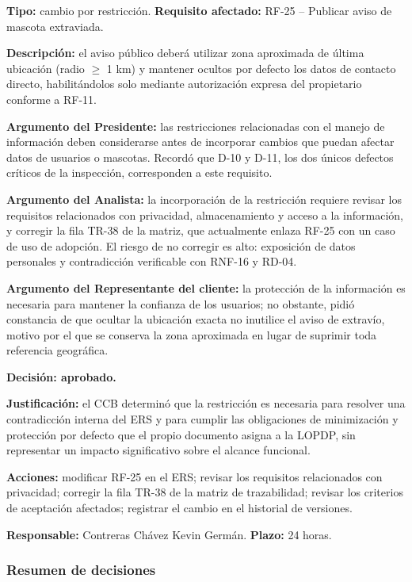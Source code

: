 \documentclass[journal,onecolumn]{IEEEtran}
\begin{document}
	\textbf{Tipo:} cambio por restricción. \quad \textbf{Requisito afectado:} RF-25 -- Publicar aviso
	de mascota extraviada.
	
	\textbf{Descripción:} el aviso público deberá utilizar zona aproximada de última ubicación
	(radio $\geq$ 1 km) y mantener ocultos por defecto los datos de contacto directo, habilitándolos
	solo mediante autorización expresa del propietario conforme a RF-11.
	
	\textbf{Argumento del Presidente:} las restricciones relacionadas con el manejo de información
	deben considerarse antes de incorporar cambios que puedan afectar datos de usuarios o mascotas.
	Recordó que D-10 y D-11, los dos únicos defectos críticos de la inspección, corresponden a este
	requisito.
	
	\textbf{Argumento del Analista:} la incorporación de la restricción requiere revisar los
	requisitos relacionados con privacidad, almacenamiento y acceso a la información, y corregir la
	fila TR-38 de la matriz, que actualmente enlaza RF-25 con un caso de uso de adopción. El riesgo de
	no corregir es alto: exposición de datos personales y contradicción verificable con RNF-16 y
	RD-04.
	
	\textbf{Argumento del Representante del cliente:} la protección de la información es necesaria
	para mantener la confianza de los usuarios; no obstante, pidió constancia de que ocultar la
	ubicación exacta no inutilice el aviso de extravío, motivo por el que se conserva la zona
	aproximada en lugar de suprimir toda referencia geográfica.
	
	\textbf{Decisión: aprobado.}
	
	\textbf{Justificación:} el CCB determinó que la restricción es necesaria para resolver una
	contradicción interna del ERS y para cumplir las obligaciones de minimización y protección por
	defecto que el propio documento asigna a la LOPDP, sin representar un impacto significativo sobre
	el alcance funcional.
	
	\textbf{Acciones:} modificar RF-25 en el ERS; revisar los requisitos relacionados con privacidad;
	corregir la fila TR-38 de la matriz de trazabilidad; revisar los criterios de aceptación
	afectados; registrar el cambio en el historial de versiones.
	
	\textbf{Responsable:} Contreras Chávez Kevin Germán. \quad \textbf{Plazo:} 24 horas.
	
	\subsubsection{Resumen de decisiones}
	
\end{document}
